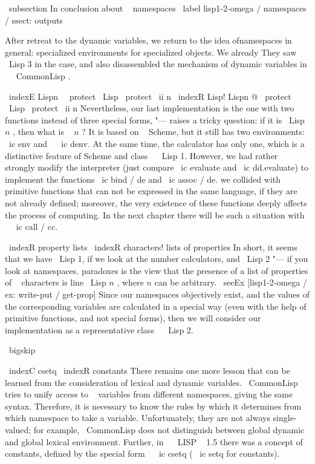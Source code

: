 \ subsection {In conclusion about ~ namespaces} %
\ label {lisp1-2-omega / namespaces / ssect: outputs}

After retreat to the dynamic variables, we return to the idea of ​​namespaces
in general: specialized environments for specialized objects. We already
They saw \ Lisp 3 in the case, and also disassembled the mechanism of dynamic variables
in ~ { \ CommonLisp }.

\ indexE {Lispn \ \ protect \ Lisp { \ protect \ ii {n}}}
\ indexR {Lisp! Lispn @ \ protect \ Lisp { \ protect \ ii {n}}}
Nevertheless, our last implementation is the one with two functions instead of
three special forms, "--- raises a tricky question: if it is \ Lisp { $ n $ }, then
what is ~ $ n $ ? It is based on ~ Scheme, but it still has two environments:
\ ic {env} and ~ \ ic {denv}. At the same time, the calculator has only one, which is
a distinctive feature of Scheme and class ~ \ Lisp 1. However, we had rather
strongly modify the interpreter (just compare \ ic {evaluate} and
\ ic {dd.evaluate}) to implement the functions \ ic {bind / de} and \ ic {assoc / de}. we
collided with ~ primitive functions that can not be expressed in the same language,
if they are not already defined; moreover, the very existence of these functions
deeply affects the process of computing. In the next chapter there will be such a situation
with ~ \ ic {call / cc}.

\ indexR {property lists}
\ indexR {characters! lists of properties}
In short, it seems that we have \ Lisp 1, if we look at the number
calculators, and \ Lisp 2 "--- if you look at namespaces.
paradoxes is the view that the presence of a list of properties of ~ characters is
line \ Lisp { $ n $ }, where $ n $ can be arbitrary.
\ seeEx [lisp1-2-omega / ex: write-put / get-prop]
Since our namespaces objectively exist, and the values ​​of the corresponding
variables are calculated in a special way (even with the help of primitive functions, and
not special forms), then we will consider our implementation as a representative
class ~ \ Lisp 2.

\ bigskip

\ indexC {csetq}
\ indexR {constants}
There remains one more lesson that can be learned from the consideration of lexical and
dynamic variables. { \ CommonLisp } tries to unify access
to ~ variables from different namespaces, giving the same syntax.
Therefore, it is necessary to know the rules by which it determines from which
namespace to take a variable. Unfortunately, they are not always single-valued;
for example, { \ CommonLisp } does not distinguish between global dynamic and global
lexical environment. Further, in ~ \ LISP ~ 1.5 there was a concept of constants,
defined by the special form ~ \ ic {csetq} ( \ ic {setq} for constants).

